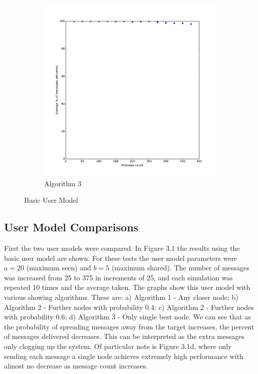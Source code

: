 \documentclass[bsc,frontabs,twoside,singlespacing,parskip,deptreport]{infthesis}     %
\begin{document}
\begin{figure}
\begin{subfigure}[b]{0.3\textwidth}
        \includegraphics[width=\textwidth]{results/BasicShare_OnlyBest}
        \caption{Algorithm 3}
        \label{fig:results/BasicShare_OnlyBest}
    \end{subfigure}
  	\vspace{-5pt}
    \caption{Basic User Model}\label{fig:BasicUserModel}
  	\vspace{-15pt}
\end{figure}

\subsection{User Model Comparisons}
First the two user models were compared. In Figure 3.1 the results using the basic user model are shown. For these tests the user model parameters were $a = 20$ (maximum seen) and $b = 5$ (maximum shared). The number of messages was increased from 25 to 375 in increments of 25, and each simulation was repeated 10 times and the average taken. The graphs show this user model with various showing algorithms. These are: a) Algorithm 1 - Any closer node; b) Algorithm 2 - Further nodes with probability 0.4; c) Algorithm 2 - Further nodes with probability 0.6; d) Algorithm 3 - Only single best node. We can see that as the probability of spreading messages away from the target increases, the percent of messages delivered decreases. This can be interpreted as the extra messages only clogging up the system. Of particular note is Figure 3.1d, where only sending each message a single node achieves extremely high performance with almost no decrease as message count increases.
\end{document}
